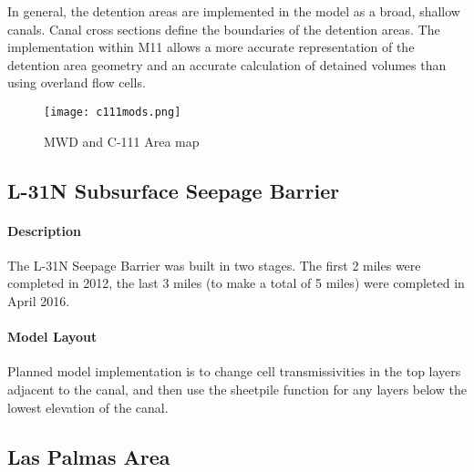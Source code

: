 In general, the detention areas are implemented in the model as a broad, shallow canals.  Canal cross sections define the boundaries of the detention areas. The implementation within M11 allows a more accurate representation of the detention area geometry and an accurate calculation of detained volumes than using overland flow cells.

\begin{figure}[!h]
  \begin{center}
  \texttt{[image: c111mods.png]}
  \caption{MWD and C-111 Area map}
  \label{fig:c111mods}
  \end{center}
\end{figure}


\clearpage
\subsection{L-31N Subsurface Seepage Barrier}
\paragraph{Description}
The L-31N Seepage Barrier was built in two stages. The first 2 miles were completed in 2012, the last 3 miles (to make a total of 5 miles) were completed in April 2016.

\paragraph{Model Layout}

\begin{notes}
Planned model implementation is to change cell transmissivities in the top layers adjacent to the canal, and then use the sheetpile function for any layers below the lowest elevation of the canal.
\end{notes}

\clearpage


\subsection{Las Palmas Area}

